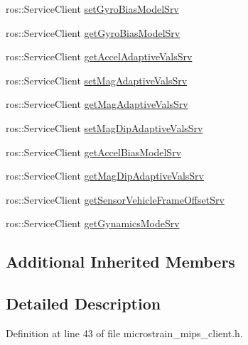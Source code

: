 \begin{DoxyCompactItemize}
\item 
ros\+::\+Service\+Client \hyperlink{classcl__microstrain__mips_1_1ClMicrostainMips_a96fa3777b87a5d8abcb0f5fe6d740934}{set\+Gyro\+Bias\+Model\+Srv}
\item 
ros\+::\+Service\+Client \hyperlink{classcl__microstrain__mips_1_1ClMicrostainMips_a4caf935b9d839aa586b562982cfc3adb}{get\+Gyro\+Bias\+Model\+Srv}
\item 
ros\+::\+Service\+Client \hyperlink{classcl__microstrain__mips_1_1ClMicrostainMips_a828f3b0adbfb1e6082fcaa1ce22928c0}{get\+Accel\+Adaptive\+Vals\+Srv}
\item 
ros\+::\+Service\+Client \hyperlink{classcl__microstrain__mips_1_1ClMicrostainMips_aeb9fb755367cd253b65bf826e421cc05}{set\+Mag\+Adaptive\+Vals\+Srv}
\item 
ros\+::\+Service\+Client \hyperlink{classcl__microstrain__mips_1_1ClMicrostainMips_a799d76ddd2e92c3624d51ffb7c4b8c89}{get\+Mag\+Adaptive\+Vals\+Srv}
\item 
ros\+::\+Service\+Client \hyperlink{classcl__microstrain__mips_1_1ClMicrostainMips_a3618b27ce1ed75f2e498c0bc6a36599d}{set\+Mag\+Dip\+Adaptive\+Vals\+Srv}
\item 
ros\+::\+Service\+Client \hyperlink{classcl__microstrain__mips_1_1ClMicrostainMips_a5516ee2ad71621f728245d0854104dc7}{get\+Accel\+Bias\+Model\+Srv}
\item 
ros\+::\+Service\+Client \hyperlink{classcl__microstrain__mips_1_1ClMicrostainMips_aa5a412d1343febccf6bda432eacb0581}{get\+Mag\+Dip\+Adaptive\+Vals\+Srv}
\item 
ros\+::\+Service\+Client \hyperlink{classcl__microstrain__mips_1_1ClMicrostainMips_a12957749416c955e1b0132cb2213f879}{get\+Sensor\+Vehicle\+Frame\+Offset\+Srv}
\item 
ros\+::\+Service\+Client \hyperlink{classcl__microstrain__mips_1_1ClMicrostainMips_a5ded1b1b3506d16e56d312b3d1a7fe13}{get\+Gynamics\+Mode\+Srv}
\end{DoxyCompactItemize}
\subsection*{Additional Inherited Members}


\subsection{Detailed Description}


Definition at line 43 of file microstrain\+\_\+mips\+\_\+client.\+h.



